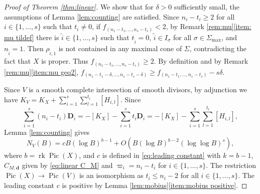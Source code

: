 \documentclass[10pt, a4paper, reqno, english]{amsart}
\newcommand{\divclass}{{\mathbf D}} %
\DeclareMathOperator{\pic}{Pic} %
\DeclareMathOperator{\rk}{rk} %
\theoremstyle{definition}
\numberwithin{theorem}{section}
\numberwithin{equation}{section}
\begin{document}
\begin{proof}[Proof of Theorem \ref{thm:linear}]
We show that for $\delta>0$ sufficiently small, the assumptions of Lemma \ref{lem:counting} are satisfied. 
Since $n_i-t_i\geq 2$ for all $i\in\{1,\dots,s\}$ such that $t_i\neq 0$, if $f_{(n_1-t_1,\dots,n_s-t_s)}<2$, by Remark \ref{rem:mu}\ref{item: mu tildef} there is $\tilde i\in\{1,\dots,s\}$ such that $t_{\tilde i}=0$, $\tilde i\in I_\sigma$ for all $\sigma\in\Sigma_{\max}$, and $n_{\tilde i}=1$. Then $\rho_{\tilde i,1}$ is not contained in any maximal cone of $\Sigma$, contradicting the fact that $X$ is proper. Thus
 $f_{(n_1-t_1,\dots,n_s-t_s)}\geq 2$. By definition and by Remark \ref{rem:mu}\ref{item:mu geq2}, $f_{(n_1-t_1-\delta,\dots,n_s-t_s-\delta)}\geq f_{(n_1-t_1,\dots,n_s-t_s)}-s\delta$.

Since $V$ is a smooth complete intersection of smooth divisors, by adjunction \cite[Proposition 16.4]{MR1225842} we have $K_V=K_X+\sum_{i=1}^s\sum_{l=1}^{t_i}[H_{i,l}]$.
Since 
\begin{equation*}
\sum_{i=1}^s(n_i-t_i)\divclass_i=-[K_X]-\sum_{i=1}^st_i\divclass_i=-[K_X]-\sum_{i=1}^s\sum_{l=1}^{t_i}[H_{i,l}],
\end{equation*}
Lemma \ref{lem:counting}  gives
	$$
N_V(B)=cB(\log B)^{b-1} +O(B(\log B)^{b-2}(\log\log B)^s),
$$
where $b=\rk\pic(X)$, and $c$ is defined in \eqref{eq:leading constant} with $k=b-1$, $C_{M,\mathbf d}$ given by \eqref{eq:linear C_M} and $\varpi_i=n_i-t_i$ for $i\in\{1,\dots,s\}$.  The restriction $\pic(X)\to\pic(V)$ is an isomorphism as $t_i\leq n_i-2$ for all $i\in\{1,\dots,s\}$. The leading constant $c$ is positive by Lemma \ref{lem:mobius}\ref{item:mobius positive}.
\end{proof}
\end{document}
